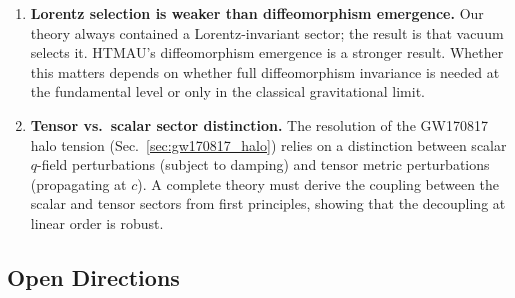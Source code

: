 \documentclass[aps,prd,twocolumn,showpacs,superscriptaddress,preprintnumbers]{revtex4-2}
\begin{document}
\begin{enumerate}
    \item \textbf{Lorentz selection is weaker than diffeomorphism emergence.} Our theory always contained a Lorentz-invariant sector; the result is that vacuum selects it. HTMAU's diffeomorphism emergence is a stronger result. Whether this matters depends on whether full diffeomorphism invariance is needed at the fundamental level or only in the classical gravitational limit.

    \item \textbf{Tensor vs.\ scalar sector distinction.} The resolution of the GW170817 halo tension (Sec.~\ref{sec:gw170817_halo}) relies on a distinction between scalar $q$-field perturbations (subject to damping) and tensor metric perturbations (propagating at $c$). A complete theory must derive the coupling between the scalar and tensor sectors from first principles, showing that the decoupling at linear order is robust.
\end{enumerate}

\subsection{Open Directions}
\end{document}
